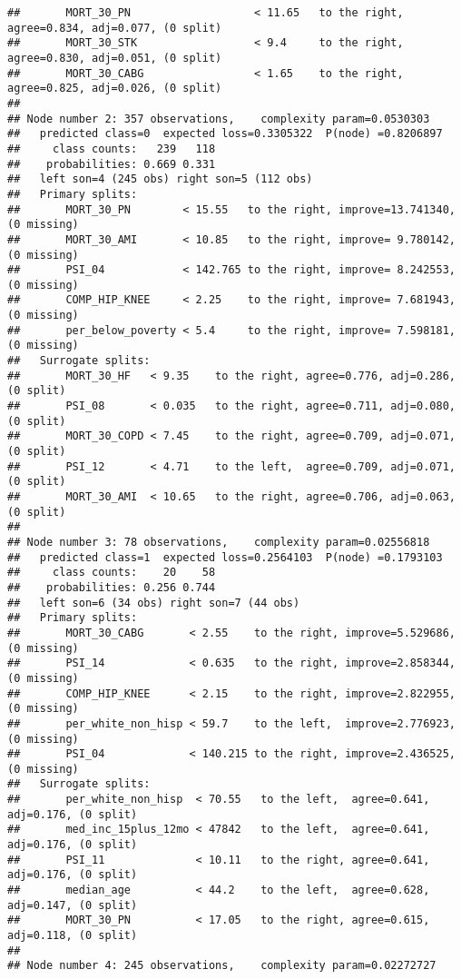 \documentclass[
]{article}
\begin{document}
\begin{verbatim}
##       MORT_30_PN                   < 11.65   to the right, agree=0.834, adj=0.077, (0 split)
##       MORT_30_STK                  < 9.4     to the right, agree=0.830, adj=0.051, (0 split)
##       MORT_30_CABG                 < 1.65    to the right, agree=0.825, adj=0.026, (0 split)
## 
## Node number 2: 357 observations,    complexity param=0.0530303
##   predicted class=0  expected loss=0.3305322  P(node) =0.8206897
##     class counts:   239   118
##    probabilities: 0.669 0.331 
##   left son=4 (245 obs) right son=5 (112 obs)
##   Primary splits:
##       MORT_30_PN        < 15.55   to the right, improve=13.741340, (0 missing)
##       MORT_30_AMI       < 10.85   to the right, improve= 9.780142, (0 missing)
##       PSI_04            < 142.765 to the right, improve= 8.242553, (0 missing)
##       COMP_HIP_KNEE     < 2.25    to the right, improve= 7.681943, (0 missing)
##       per_below_poverty < 5.4     to the right, improve= 7.598181, (0 missing)
##   Surrogate splits:
##       MORT_30_HF   < 9.35    to the right, agree=0.776, adj=0.286, (0 split)
##       PSI_08       < 0.035   to the right, agree=0.711, adj=0.080, (0 split)
##       MORT_30_COPD < 7.45    to the right, agree=0.709, adj=0.071, (0 split)
##       PSI_12       < 4.71    to the left,  agree=0.709, adj=0.071, (0 split)
##       MORT_30_AMI  < 10.65   to the right, agree=0.706, adj=0.063, (0 split)
## 
## Node number 3: 78 observations,    complexity param=0.02556818
##   predicted class=1  expected loss=0.2564103  P(node) =0.1793103
##     class counts:    20    58
##    probabilities: 0.256 0.744 
##   left son=6 (34 obs) right son=7 (44 obs)
##   Primary splits:
##       MORT_30_CABG       < 2.55    to the right, improve=5.529686, (0 missing)
##       PSI_14             < 0.635   to the right, improve=2.858344, (0 missing)
##       COMP_HIP_KNEE      < 2.15    to the right, improve=2.822955, (0 missing)
##       per_white_non_hisp < 59.7    to the left,  improve=2.776923, (0 missing)
##       PSI_04             < 140.215 to the right, improve=2.436525, (0 missing)
##   Surrogate splits:
##       per_white_non_hisp  < 70.55   to the left,  agree=0.641, adj=0.176, (0 split)
##       med_inc_15plus_12mo < 47842   to the left,  agree=0.641, adj=0.176, (0 split)
##       PSI_11              < 10.11   to the right, agree=0.641, adj=0.176, (0 split)
##       median_age          < 44.2    to the left,  agree=0.628, adj=0.147, (0 split)
##       MORT_30_PN          < 17.05   to the right, agree=0.615, adj=0.118, (0 split)
## 
## Node number 4: 245 observations,    complexity param=0.02272727

\end{verbatim}
\end{document}
